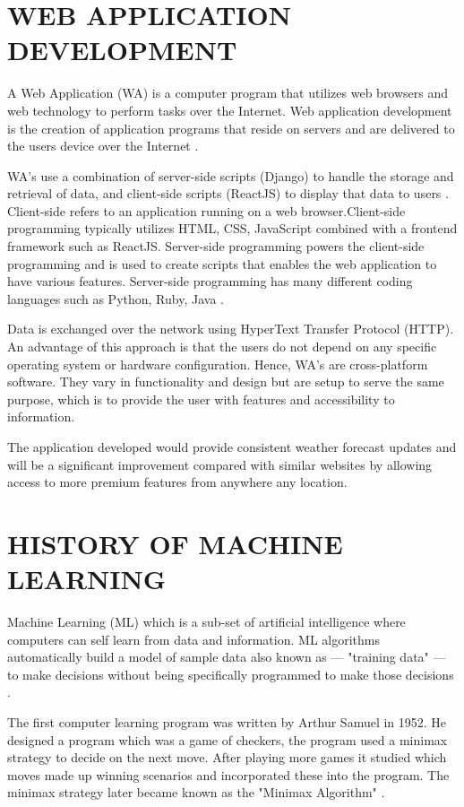 \section{WEB APPLICATION DEVELOPMENT}
A Web Application (WA) is a computer program that utilizes web browsers and web technology to perform tasks over the Internet. Web application development is the creation of application programs that reside on servers and are delivered to the users device over the Internet \cite{WebAppDef}.

WA's use a combination of server-side scripts (Django) to handle the storage and retrieval of data, and client-side scripts (ReactJS) to display that data to users \cite{WebApp}. Client-side refers to an application running on a web browser.Client-side programming typically utilizes HTML, CSS, JavaScript combined with a frontend framework such as ReactJS. Server-side programming powers the client-side programming and is used to create scripts that enables the web application to have various features. Server-side programming has many different coding languages such as Python, Ruby, Java \cite{WebAppDef}.

Data is exchanged over the network using HyperText Transfer Protocol (HTTP). An advantage of this approach is that the users do not depend on any specific operating system or hardware configuration. Hence, WA's are cross-platform software. They vary in functionality and design but are setup to serve the same purpose, which is to provide the user with features and accessibility to information.

The application developed would provide consistent weather forecast updates and will be a significant improvement compared with similar websites by allowing access to more premium features from anywhere any location. 

\section{HISTORY OF MACHINE LEARNING}
Machine Learning (ML) which is a sub-set of artificial intelligence where computers can self learn from data and information. ML algorithms automatically build a model of sample data also known as — "training data" — to make decisions without being specifically programmed to make those decisions \cite{MLAlgorithms}.

The first computer learning program was written by Arthur Samuel in 1952. He designed a program which was a game of checkers, the program used a minimax strategy to decide on the next move. After playing more games it studied which moves made up winning scenarios and incorporated these into the program. The minimax strategy later became known as the "Minimax Algorithm" \cite{MiniMax}.

